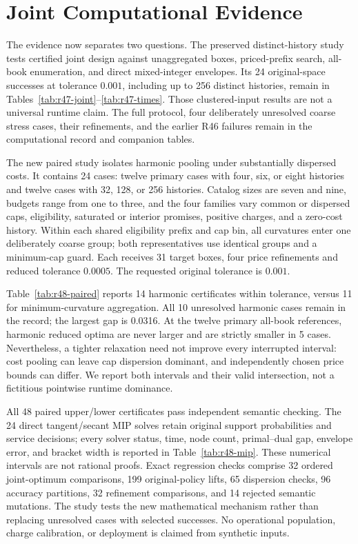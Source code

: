 \section{Joint Computational Evidence}\label{sec:r48-study}
The evidence now separates two questions. The preserved distinct-history study tests certified joint design against unaggregated boxes, priced-prefix search, all-book enumeration, and direct mixed-integer envelopes. Its 24 original-space successes at tolerance $0.001$, including up to 256 distinct histories, remain in Tables~\ref{tab:r47-joint}--\ref{tab:r47-times}. Those clustered-input results are not a universal runtime claim. The full protocol, four deliberately unresolved coarse stress cases, their refinements, and the earlier R46 failures remain in the computational record and companion tables.

The new paired study isolates harmonic pooling under substantially dispersed costs. It contains 24 cases: twelve primary cases with four, six, or eight histories and twelve cases with 32, 128, or 256 histories. Catalog sizes are seven and nine, budgets range from one to three, and the four families vary common or dispersed caps, eligibility, saturated or interior promises, positive charges, and a zero-cost history. Within each shared eligibility prefix and cap bin, all curvatures enter one deliberately coarse group; both representatives use identical groups and a minimum-cap guard. Each receives 31 target boxes, four price refinements and reduced tolerance $0.0005$. The requested original tolerance is $0.001$.

Table~\ref{tab:r48-paired} reports 14 harmonic certificates within tolerance, versus 11 for minimum-curvature aggregation. All 10 unresolved harmonic cases remain in the record; the largest gap is 0.0316. At the twelve primary all-book references, harmonic reduced optima are never larger and are strictly smaller in 5 cases. Nevertheless, a tighter relaxation need not improve every interrupted interval: cost pooling can leave cap dispersion dominant, and independently chosen price bounds can differ. We report both intervals and their valid intersection, not a fictitious pointwise runtime dominance.

All 48 paired upper/lower certificates pass independent semantic checking. The 24 direct tangent/secant MIP solves retain original support probabilities and service decisions; every solver status, time, node count, primal--dual gap, envelope error, and bracket width is reported in Table~\ref{tab:r48-mip}. These numerical intervals are not rational proofs. Exact regression checks comprise 32 ordered joint-optimum comparisons, 199 original-policy lifts, 65 dispersion checks, 96 accuracy partitions, 32 refinement comparisons, and 14 rejected semantic mutations. The study tests the new mathematical mechanism rather than replacing unresolved cases with selected successes. No operational population, charge calibration, or deployment is claimed from synthetic inputs.
